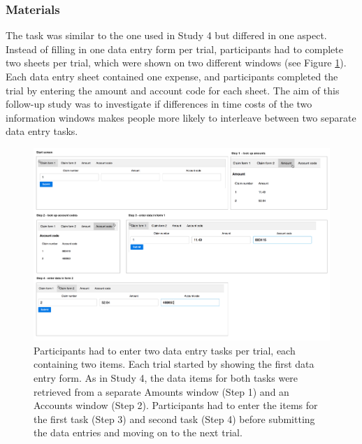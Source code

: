 \subsubsection{Materials}
The task was similar to the one used in Study 4 but differed in one aspect. Instead of filling in one data entry form per trial, participants had to complete two sheets per trial, which were shown on two different windows (see Figure \ref{fig:ch34_5-tasklayout}). Each data entry sheet contained one expense, and participants completed the trial by entering the amount and account code for each sheet. The aim of this follow-up study was to investigate if differences in time costs of the two information windows makes people more likely to interleave between two separate data entry tasks.

\begin{figure}
\includegraphics[width=\textwidth]{images/ch34/ch34-5_Tasksequence.pdf}
    \caption{Participants had to enter two data entry tasks per trial, each containing two items. Each trial started by showing the first data entry form. As in Study 4, the data items for both tasks were retrieved from a separate Amounts window (Step 1) and an Accounts window (Step 2). Participants had to enter the items for the first task (Step 3) and second task (Step 4) before submitting the data entries and moving on to the next trial.}\label{fig:ch34_5-tasklayout}
\end{figure}

